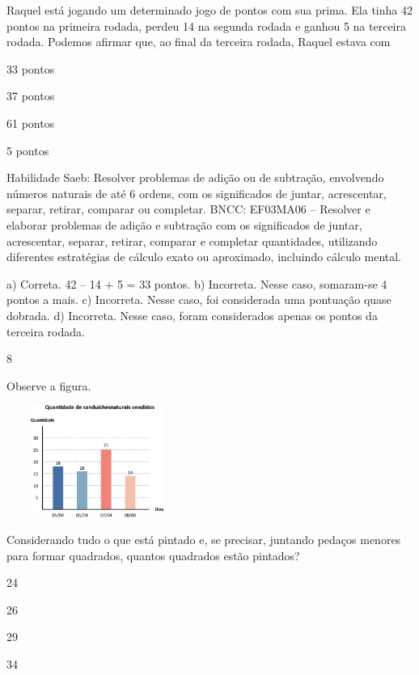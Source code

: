\begin{escolha}
{\begin{escolha}
{Raquel está jogando um determinado jogo de pontos com sua prima. Ela
tinha 42 pontos na primeira rodada, perdeu 14 na segunda rodada e ganhou
5 na terceira rodada. Podemos afirmar que, ao final da terceira rodada, Raquel estava com

\begin{escolha}
\item
  33 pontos
\item
  37 pontos
\item
  61 pontos
\item
  5 pontos
\end{escolha}

Habilidade Saeb: Resolver problemas de adição ou de subtração,
envolvendo números naturais de até 6 ordens, com os significados de
juntar, acrescentar, separar, retirar, comparar ou completar.
BNCC: EF03MA06 – Resolver e elaborar problemas de adição e subtração com os significados de
juntar, acrescentar, separar, retirar, comparar e completar quantidades, utilizando diferentes
estratégias de cálculo exato ou aproximado, incluindo cálculo mental.


a) Correta. 42 -- 14 + 5 = 33 pontos.
b) Incorreta. Nesse caso, somaram-se 4 pontos a mais.
c) Incorreta. Nesse caso, foi considerada uma pontuação quase dobrada.
d) Incorreta. Nesse caso, foram considerados apenas os pontos da terceira rodada.

\num{8}

Observe a figura.


\includegraphics[width=2.32692in,height=1.43990in]{media/image109.png}

Considerando tudo o que está pintado e, se precisar, juntando pedaços
menores para formar quadrados, quantos quadrados estão pintados?

\begin{escolha}
\item
  24
\item
  26
\item
  29
\item
  34
\end{escolha}


}
\end{escolha}}
\end{escolha}
